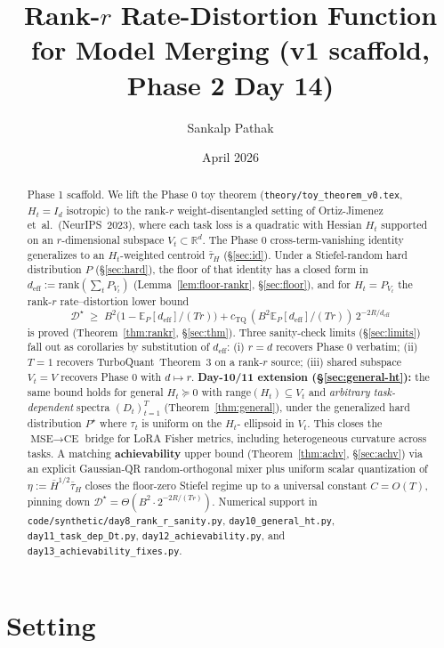 \documentclass{article}
\title{Rank-$r$ Rate-Distortion Function for Model Merging
  (v1 scaffold, Phase 2 Day 14)}
\author{Sankalp Pathak}
\date{April 2026}
\theoremstyle{remark}
\newcommand{\R}{\mathbb{R}}
\newcommand{\E}{\mathbb{E}}
\newcommand{\rank}{\mathrm{rank}}
\newcommand{\range}{\mathrm{range}}
\newcommand{\deff}{d_{\mathrm{eff}}}
\newcommand{\tauH}{\bar\tau_{H}}
\begin{document}
\maketitle

\begin{abstract}
Phase 1 scaffold. We lift the Phase 0 toy theorem
(\texttt{theory/toy\_theorem\_v0.tex}, $H_t = I_d$ isotropic) to the
rank-$r$ weight-disentangled setting of Ortiz-Jimenez et~al.\
(NeurIPS~2023), where each task loss is a quadratic with Hessian
$H_t$ supported on an $r$-dimensional subspace $V_t \subset \R^d$.
The Phase 0 cross-term-vanishing identity generalizes to an
$H_t$-weighted centroid $\tauH$ (\S\ref{sec:id}). Under a
Stiefel-random hard distribution $P$ (\S\ref{sec:hard}), the floor
of that identity has a closed form in $\deff := \rank(\sum_t P_{V_t})$
(Lemma~\ref{lem:floor-rankr}, \S\ref{sec:floor}), and for
$H_t = P_{V_t}$ the rank-$r$ rate--distortion lower bound
\[
  \mathcal{D}^\star \;\geq\; B^2\bigl(1-\E_P[\deff]/(Tr)\bigr)
  + c_{\mathrm{TQ}}\,(B^2\E_P[\deff]/(Tr))\,2^{-2R/\deff}
\]
is proved (Theorem~\ref{thm:rankr}, \S\ref{sec:thm}). Three
sanity-check limits (\S\ref{sec:limits}) fall out as corollaries by
substitution of $\deff$: (i) $r=d$ recovers Phase 0 verbatim; (ii)
$T=1$ recovers TurboQuant~Theorem~3 on a rank-$r$ source; (iii)
shared subspace $V_t = V$ recovers Phase 0 with $d \mapsto r$.
\textbf{Day-10/11 extension (\S\ref{sec:general-ht}):} the same bound
holds for general $H_t \succeq 0$ with $\range(H_t) \subseteq V_t$
and \emph{arbitrary task-dependent} spectra $(D_t)_{t=1}^T$
(Theorem~\ref{thm:general}), under the generalized hard
distribution $P^\star$ where $\tau_t$ is uniform on the $H_t$-
ellipsoid in $V_t$. This closes the $\text{MSE}\to\text{CE}$
bridge for LoRA Fisher metrics, including heterogeneous curvature
across tasks.
A matching \textbf{achievability} upper bound
(Theorem~\ref{thm:achv}, \S\ref{sec:achv}) via an explicit
Gaussian-QR random-orthogonal mixer plus uniform scalar
quantization of $\eta := \bar H^{1/2}\tauH$ closes the floor-zero
Stiefel regime up to a universal constant $C = O(T)$, pinning
down $\mathcal{D}^\star = \Theta(B^2\cdot 2^{-2R/(Tr)})$.
Numerical support in \texttt{code/synthetic/day8\_rank\_r\_sanity.py},
\texttt{day10\_general\_ht.py}, \texttt{day11\_task\_dep\_Dt.py},
\texttt{day12\_achievability.py}, and
\texttt{day13\_achievability\_fixes.py}.
\end{abstract}

\section{Setting}\label{sec:setting}
\end{document}
